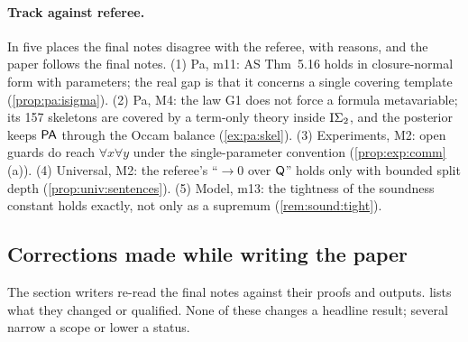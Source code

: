 \paragraph{Track against referee.} In five places the final notes disagree with the referee, with reasons, and the paper follows the final notes. (1) Pa, m11: AS Thm~5.16 holds in closure-normal form with parameters; the real gap is that it concerns a single covering template (\cref{prop:pa:isigma}). (2) Pa, M4: the law G1 does not force a formula metavariable; its 157 skeletons are covered by a term-only theory inside $\mathrm{I}\Sigma_{2}$, and the posterior keeps $\mathsf{PA}$ through the Occam balance (\cref{ex:pa:skel}). (3) Experiments, M2: open guards do reach $\forall x\forall y$ under the single-parameter convention (\cref{prop:exp:comm}(a)). (4) Universal, M2: the referee's ``$\to0$ over $\mathsf{Q}$'' holds only with bounded split depth (\cref{prop:univ:sentences}). (5) Model, m13: the tightness of the soundness constant holds exactly, not only as a supremum (\cref{rem:sound:tight}).

\subsection{Corrections made while writing the paper}\label{app:ver:writing}

The section writers re-read the final notes against their proofs and outputs.  lists what they changed or qualified. None of these changes a headline result; several narrow a scope or lower a status.

